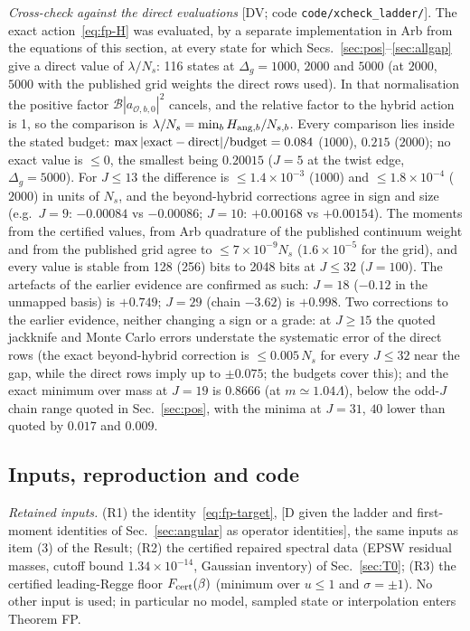 \emph{Cross-check against the direct evaluations} [DV; code \texttt{code/xcheck\_ladder/}]. The exact action~\eqref{eq:fp-H}
was evaluated, by a separate implementation in Arb from the equations of this section, at every state for which
Secs.~\ref{sec:pos}--\ref{sec:allgap} give a direct value of $\lambda/N_s$: 116 states at $\Delta_g=1000$, $2000$ and $5000$ (at $2000$,
$5000$ with the published grid weights the direct rows used). In that normalisation the positive factor $\mathcal B|a_{\mathcal O,b,0}|^2$
cancels, and the relative factor to the hybrid action is 1, so the comparison is $\lambda/N_s=\min_bH_{{\rm ang},b}/N_{s,b}$. Every
comparison lies inside the stated budget: $\max|{\rm exact}-{\rm direct}|/{\rm budget}=0.084$ ($1000$), $0.215$ ($2000$); no exact value is
$\le0$, the smallest being $0.20015$ ($J=5$ at the twist edge, $\Delta_g=5000$). For $J\le13$ the difference is $\le1.4\times10^{-3}$ ($1000$)
and $\le1.8\times10^{-4}$ ($2000$) in units of $N_s$, and the beyond-hybrid corrections agree in sign and size (e.g.\ $J=9$: $-0.00084$ vs
$-0.00086$; $J=10$: $+0.00168$ vs $+0.00154$). The moments from the certified values, from Arb quadrature of the published continuum
weight and from the published grid agree to $\le7\times10^{-9}N_s$ ($1.6\times10^{-5}$ for the grid), and every value is stable from 128
(256) bits to 2048 bits at $J\le32$ ($J=100$). The artefacts of the earlier evidence are confirmed as such: $J=18$ ($-0.12$ in the
unmapped basis) is $+0.749$; $J=29$ (chain $-3.62$) is $+0.998$. Two corrections to the earlier evidence, neither changing a sign or
a grade: at $J\ge15$ the quoted jackknife and Monte Carlo errors understate the systematic error of the direct rows (the exact
beyond-hybrid correction is $\le0.005\,N_s$ for every $J\le32$ near the gap, while the direct rows imply up to $\pm0.075$; the budgets
cover this); and the exact minimum over mass at $J=19$ is $0.8666$ (at $m\simeq1.04\Lambda$), below the odd-$J$ chain range quoted in
Sec.~\ref{sec:pos}, with the minima at $J=31$, $40$ lower than quoted by $0.017$ and $0.009$.

\subsection{Inputs, reproduction and code}
\emph{Retained inputs.} (R1) the identity~\eqref{eq:fp-target}, [D given the ladder and first-moment identities of
Sec.~\ref{sec:angular} as operator identities], the same inputs as item (3) of the Result; (R2) the certified repaired spectral data
(EPSW residual masses, cutoff bound $1.34\times10^{-14}$, Gaussian inventory) of Sec.~\ref{sec:T0}; (R3) the certified leading-Regge floor
$F_{\rm cert}(\beta)$ (minimum over $u\le1$ and $\sigma=\pm1$). No other input is used; in particular no model, sampled state or
interpolation enters Theorem FP.


